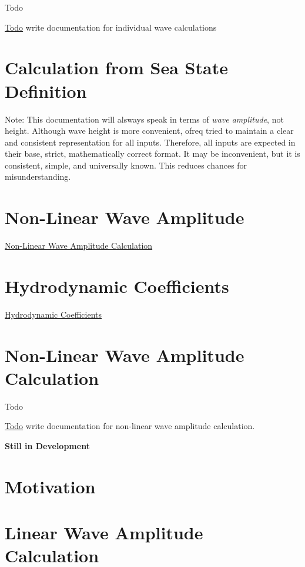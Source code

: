 \begin{DoxyRefDesc}{Todo}
\item[\hyperlink{todo__todo000048}{Todo}]write documentation for individual wave calculations\end{DoxyRefDesc}


\section*{Calculation from Sea State Definition}

Note\-: This documentation will alsways speak in terms of {\itshape wave amplitude}, not height. Although wave height is more convenient, ofreq tried to maintain a clear and consistent representation for all inputs. Therefore, all inputs are expected in their base, strict, mathematically correct format. It may be inconvenient, but it is consistent, simple, and universally known. This reduces chances for misunderstanding.

\section*{Non-\/\-Linear Wave Amplitude}

\hyperlink{non-linear_wave}{Non-\/\-Linear Wave Amplitude Calculation}

\section*{Hydrodynamic Coefficients}

\hyperlink{hydrodynamic_coefficients}{Hydrodynamic Coefficients} \hypertarget{non-linear_wave}{}\section{Non-\/\-Linear Wave Amplitude Calculation}\label{non-linear_wave}
\begin{DoxyRefDesc}{Todo}
\item[\hyperlink{todo__todo000047}{Todo}]write documentation for non-\/linear wave amplitude calculation.\end{DoxyRefDesc}


{\bfseries Still in Development}

\section*{Motivation}

\section*{Linear Wave Amplitude Calculation}

